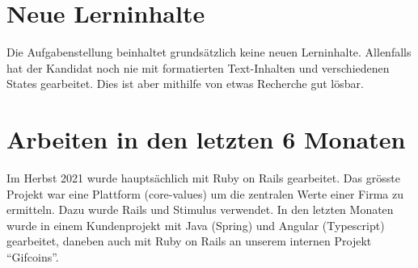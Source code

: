 \section{Neue Lerninhalte}

Die Aufgabenstellung beinhaltet grundsätzlich keine neuen Lerninhalte. Allenfalls hat der Kandidat noch nie mit formatierten Text-Inhalten und verschiedenen States gearbeitet. Dies ist aber mithilfe von etwas Recherche gut lösbar.

\section{Arbeiten in den letzten 6 Monaten}

Im Herbst 2021 wurde hauptsächlich mit Ruby on Rails gearbeitet. Das grösste Projekt war eine Plattform (core-values) um die zentralen Werte einer Firma zu ermitteln.
Dazu wurde Rails und Stimulus verwendet. In den letzten Monaten wurde in einem Kundenprojekt mit Java (Spring) und Angular (Typescript) gearbeitet, daneben auch mit Ruby on Rails an unserem internen Projekt “Gifcoins”.
